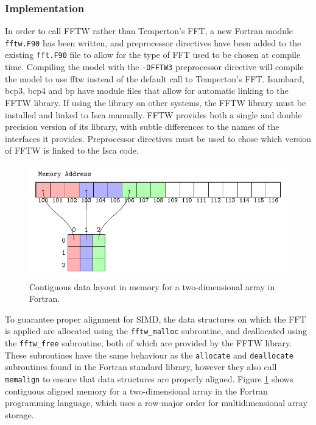 \documentclass[a4paper,11pt]{report}
\begin{document}
\subsubsection{Implementation}
In order to call FFTW rather than Temperton's FFT, a new Fortran module \texttt{fftw.F90} has been written, and preprocessor directives have been added to the existing \texttt{fft.F90} file to allow for the type of FFT used to be chosen at compile time. Compiling the model with the \texttt{-DFFTW3} preprocessor directive will compile the model to use \gls{fftw} instead of the default call to Temperton's FFT. Isambard, \gls{bcp3}, \gls{bcp4} and \gls{bp} have module files that allow for automatic linking to the FFTW library. If using the library on other systems, the FFTW library must be installed and linked to Isca manually. FFTW provides both a single and double precision version of its library, with subtle differences to the names of the interfaces it provides. Preprocessor directives must be used to chose which version of FFTW is linked to the Isca code. 
\par
\begin{figure}[htbp]
\begin{center}
\includegraphics[width=\textwidth]{img/tikz-img/data_layout/data_layout.pdf}
\caption[Two-dimensional data layout in Fortran]{Contiguous data layout in memory for a two-dimensional array in Fortran.}
\label{fig:memalign}
\end{center}
\end{figure}
\par
To guarantee proper alignment for SIMD, the data structures on which the FFT is applied are allocated using the \texttt{fftw\_malloc} subroutine, and deallocated using the \texttt{fftw\_free} subroutine, both of which are provided by the FFTW library. These subroutines have the same behaviour as the \texttt{allocate} and \texttt{deallocate} subroutines found in the Fortran standard library, however they also call \texttt{memalign} to ensure that data structures are properly aligned. Figure \ref{fig:memalign} shows contiguous aligned memory for a two-dimensional array in the Fortran programming language, which uses a row-major order for multidimensional array storage.
\end{document}

